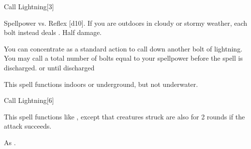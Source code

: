 \begin{spellsection}{Call Lightning}[3]
    \begin{spellheader}
    \end{spellheader}
    \begin{spellcontent}
        \begin{spelltargetinginfo}
        \end{spelltargetinginfo}
        \begin{spelleffects}
            \begin{spellattack}{Spellpower vs. Reflex}
                \spellsuccess {}[d10].
                If you are outdoors in cloudy or stormy weather, each bolt instead deals .
                \spellfailure Half damage.
            \end{spellattack}
            \spelleffect You can concentrate as a standard action to call down another bolt of lightning. You may call a total number of bolts equal to your spellpower before the spell is discharged.
            \spelldur \durmed or until discharged \dismissable
        \end{spelleffects}
    \end{spellcontent}
    \begin{spellfooter}
        \spellnotes This spell functions indoors or underground, but not underwater. \destructivespellnotes
        \miscastexplode
    \end{spellfooter}
\end{spellsection}

\begin{spellsection}[Greater]{Call Lightning}[6]
    \begin{spellheader}
    \end{spellheader}
    \begin{spellcontent}
        \begin{spelltargetinginfo}
        \end{spelltargetinginfo}
        \begin{spelleffects}
            \spellspecial This spell functions like , except that creatures struck are also \staggered for 2 rounds if the attack succeeds.
        \end{spelleffects}
    \end{spellcontent}
    \begin{spellfooter}
        \spellnotes As .
        \miscastexplode
    \end{spellfooter}
\end{spellsection}

